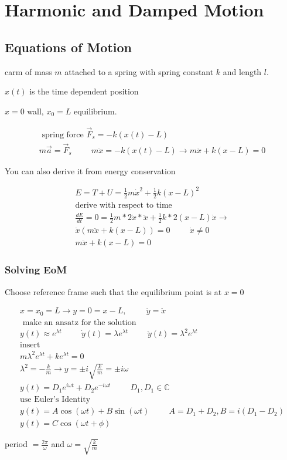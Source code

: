 \documentclass[fleqn]{report}
\newcommand{\hp}{\hspace{1cm}}
\newcommand{\equations} [1] {
\begin{gather*}
#1
\end{gather*}
}
\begin{document}
\chapter{Harmonic and Damped Motion}

\section{Equations of Motion}
carm of mass $m$ attached to a spring with spring constant $k$ and length $l$.

$x(t)$ is the time dependent position 

$x = 0$ wall, $x_0 = L$ equilibrium. 

\equations{
    \textrm{ spring force } \vec F_s = -k (x(t) - L)
    \\
    m \vec a = \vec F_s
    \hp 
    m \ddot x = -k (x(t) - L)
    \rightarrow
    m \ddot x + k(x - L) = 0
}

You can also derive it from energy conservation 

\equations{
    E = T + U = 
    \frac{1}{2} m \dot x^2 + \frac{1}{2} k (x - L)^2
    \\
    \textrm{derive with respect to time}
    \\
    \frac{dE}{dt} = 0 = 
    \frac{1}{2}m * 2 \dot x * \ddot x + \frac{1}{2} k * 2(x - L) \dot x 
    \rightarrow
    \\
    \dot x (m \ddot x  + k(x - L)) = 0
    \hp 
    \dot x \neq 0 
    \\
    m \ddot x  + k(x - L) = 0
}

\subsection{Solving EoM}
Choose reference frame such that the equilibrium point is at $x = 0$ 

\equations{
    x = x_0 = L \rightarrow y = 0 = x - L, \hp \ddot y = \ddot x
    \\
    \textrm{ make an ansatz for the solution }
    \\
    y(t) \approx e^{\lambda t}
    \hp 
    \dot y(t) = \lambda e^{\lambda t}
    \hp
    \ddot y(t) = \lambda^2 e^{\lambda t}
    \\
    \textrm{insert}
    \\
    m \lambda^2 e^{\lambda t} + k e^{\lambda t} = 0
    \\
    \lambda^2 = - \frac{k}{m} \rightarrow y = 
    \pm i\sqrt{\frac{k}{m}} = \pm i \omega
    \\
    y(t) = D_1 e^{i \omega t} + D_2 e^{- i \omega t}
    \hp D_1, D_1 \in \mathbb{C}
    \\
    \textrm{use Euler's Identity}
    \\
    y(t) = A \cos(\omega t) + B \sin(\omega t)
    \hp 
    A = D_1 + D_2, B = i(D_1 - D_2)
    \\
    y(t) = C \cos(\omega t + \phi)
}
period $= \frac{2 \pi}{\omega}$ and $\omega = \sqrt{\frac{k}{m}}$ 
\end{document}
